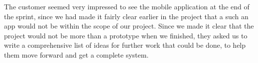 The customer seemed very impressed to see the mobile application at the end of the sprint, since we had made it fairly clear earlier in the project that a such an app would not be within the scope of our project. Since we made it clear that the project would not be more than a prototype when we finished, they asked us to write a comprehensive list of ideas for further work that could be done, to help them move forward and get a complete system.






